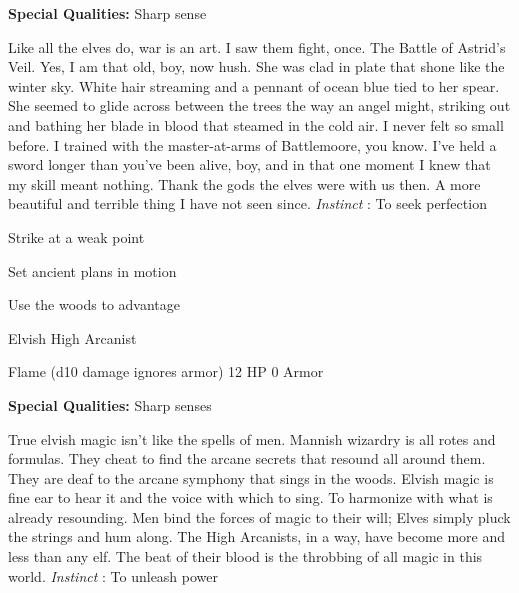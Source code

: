        
\startMonsterQualities
         {\bf Special Qualities:}  Sharp sense
\stopMonsterQualities
       
\startMonsterDescription
Like all the elves do, war is an art. I saw them fight, once. The Battle of Astrid’s Veil. Yes, I am that old, boy, now hush. She was clad in plate that shone like the winter sky. White hair streaming and a pennant of ocean blue tied to her spear. She seemed to glide across between the trees the way an angel might, striking out and bathing her blade in blood that steamed in the cold air. I never felt so small before. I trained with the master-at-arms of Battlemoore, you know. I’ve held a sword longer than you’ve been alive, boy, and in that one moment I knew that my skill meant nothing. Thank the gods the elves were with us then. A more beautiful and terrible thing I have not seen since. {\em Instinct} : To seek perfection
\stopMonsterDescription
       
\startitemize[1,packed]
         
\item Strike at a weak point

         
\item Set ancient plans in motion

         
\item Use the woods to advantage

       
\stopitemize
       
\startMonsterName
Elvish High Arcanist	 
\stopMonsterName
       

Flame (d10 damage ignores armor)	12 HP	0 Armor

       


       
\startMonsterQualities
         {\bf Special Qualities:}  Sharp senses
\stopMonsterQualities
       
\startMonsterDescription
True elvish magic isn’t like the spells of men. Mannish wizardry is all rotes and formulas. They cheat to find the arcane secrets that resound all around them. They are deaf to the arcane symphony that sings in the woods. Elvish magic is fine ear to hear it and the voice with which to sing. To harmonize with what is already resounding. Men bind the forces of magic to their will; Elves simply pluck the strings and hum along. The High Arcanists, in a way, have become more and less than any elf. The beat of their blood is the throbbing of all magic in this world. {\em Instinct} : To unleash power
\stopMonsterDescription
       
